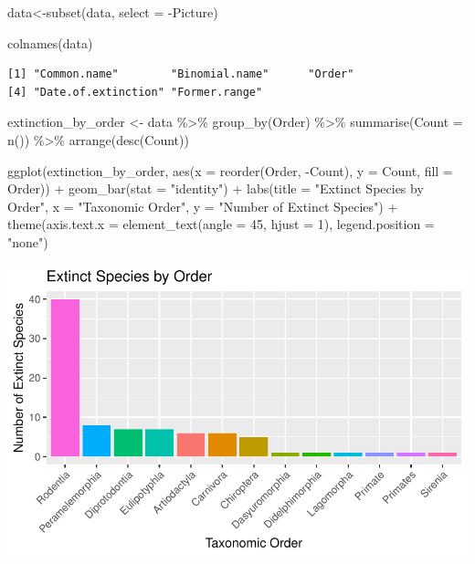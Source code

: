 \documentclass[
  letterpaper,
  DIV=11,
  numbers=noendperiod]{scrartcl}
\newenvironment{Shaded}{\begin{snugshade}}{\end{snugshade}}
\newcommand{\AttributeTok}[1]{\textcolor[rgb]{0.40,0.45,0.13}{#1}}
\newcommand{\DecValTok}[1]{\textcolor[rgb]{0.68,0.00,0.00}{#1}}
\newcommand{\FunctionTok}[1]{\textcolor[rgb]{0.28,0.35,0.67}{#1}}
\newcommand{\NormalTok}[1]{\textcolor[rgb]{0.00,0.23,0.31}{#1}}
\newcommand{\OtherTok}[1]{\textcolor[rgb]{0.00,0.23,0.31}{#1}}
\newcommand{\SpecialCharTok}[1]{\textcolor[rgb]{0.37,0.37,0.37}{#1}}
\newcommand{\StringTok}[1]{\textcolor[rgb]{0.13,0.47,0.30}{#1}}
\begin{document}
\begin{Shaded}
\begin{Highlighting}[]
\NormalTok{data}\OtherTok{\textless{}{-}}\FunctionTok{subset}\NormalTok{(data, }\AttributeTok{select =} \SpecialCharTok{{-}}\NormalTok{Picture)}

\FunctionTok{colnames}\NormalTok{(data)}
\end{Highlighting}
\end{Shaded}

\begin{verbatim}
[1] "Common.name"        "Binomial.name"      "Order"             
[4] "Date.of.extinction" "Former.range"      
\end{verbatim}

\begin{Shaded}
\begin{Highlighting}[]
\NormalTok{extinction\_by\_order }\OtherTok{\textless{}{-}}\NormalTok{ data }\SpecialCharTok{\%\textgreater{}\%}
  \FunctionTok{group\_by}\NormalTok{(Order) }\SpecialCharTok{\%\textgreater{}\%}
  \FunctionTok{summarise}\NormalTok{(}\AttributeTok{Count =} \FunctionTok{n}\NormalTok{()) }\SpecialCharTok{\%\textgreater{}\%}
  \FunctionTok{arrange}\NormalTok{(}\FunctionTok{desc}\NormalTok{(Count))}


\FunctionTok{ggplot}\NormalTok{(extinction\_by\_order, }\FunctionTok{aes}\NormalTok{(}\AttributeTok{x =} \FunctionTok{reorder}\NormalTok{(Order, }\SpecialCharTok{{-}}\NormalTok{Count), }\AttributeTok{y =}\NormalTok{ Count, }\AttributeTok{fill =}\NormalTok{ Order)) }\SpecialCharTok{+}
  \FunctionTok{geom\_bar}\NormalTok{(}\AttributeTok{stat =} \StringTok{"identity"}\NormalTok{) }\SpecialCharTok{+}
  \FunctionTok{labs}\NormalTok{(}\AttributeTok{title =} \StringTok{"Extinct Species by Order"}\NormalTok{,}
       \AttributeTok{x =} \StringTok{"Taxonomic Order"}\NormalTok{,}
       \AttributeTok{y =} \StringTok{"Number of Extinct Species"}\NormalTok{) }\SpecialCharTok{+}
  \FunctionTok{theme}\NormalTok{(}\AttributeTok{axis.text.x =} \FunctionTok{element\_text}\NormalTok{(}\AttributeTok{angle =} \DecValTok{45}\NormalTok{, }\AttributeTok{hjust =} \DecValTok{1}\NormalTok{), }
        \AttributeTok{legend.position =} \StringTok{"none"}\NormalTok{)}
\end{Highlighting}
\end{Shaded}

\includegraphics{Extinct-species-by-region-_files/figure-pdf/unnamed-chunk-2-1.pdf}
\end{document}
